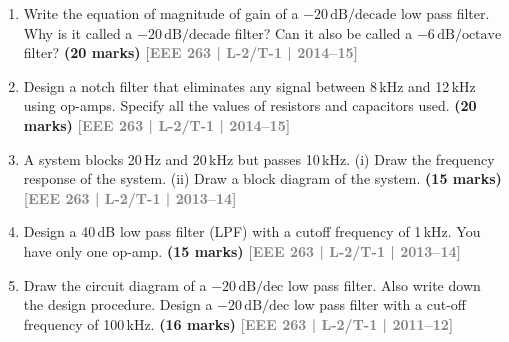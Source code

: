 \documentclass[12pt,a3paper]{article}
\newcommand{\yr}[1]{\hfill\textcolor{gray}{\small\textbf{[#1]}}}
\newcommand{\mk}[1]{\textcolor{orange!70!black}{\small\textbf{(#1 marks)}}}
\begin{document}
\begin{enumerate}
\begin{center}
\end{center}
\mk{23} \yr{EEE 263 | L-2/T-1 | 2015--16}

\item Write the equation of magnitude of gain of a $-20\,\text{dB/decade}$ low pass filter. Why is it called a $-20\,\text{dB/decade}$ filter? Can it also be called a $-6\,\text{dB/octave}$ filter?
\mk{20} \yr{EEE 263 | L-2/T-1 | 2014--15}

\item Design a notch filter that eliminates any signal between 8\,kHz and 12\,kHz using op-amps. Specify all the values of resistors and capacitors used.
\mk{20} \yr{EEE 263 | L-2/T-1 | 2014--15}

\item A system blocks 20\,Hz and 20\,kHz but passes 10\,kHz. (i) Draw the frequency response of the system. (ii) Draw a block diagram of the system.
\mk{15} \yr{EEE 263 | L-2/T-1 | 2013--14}

\item Design a 40\,dB low pass filter (LPF) with a cutoff frequency of 1\,kHz. You have only one op-amp.
\mk{15} \yr{EEE 263 | L-2/T-1 | 2013--14}

\item Draw the circuit diagram of a $-20\,\text{dB/dec}$ low pass filter. Also write down the design procedure. Design a $-20\,\text{dB/dec}$ low pass filter with a cut-off frequency of 100\,kHz.
\mk{16} \yr{EEE 263 | L-2/T-1 | 2011--12}

\end{enumerate}
\end{document}

